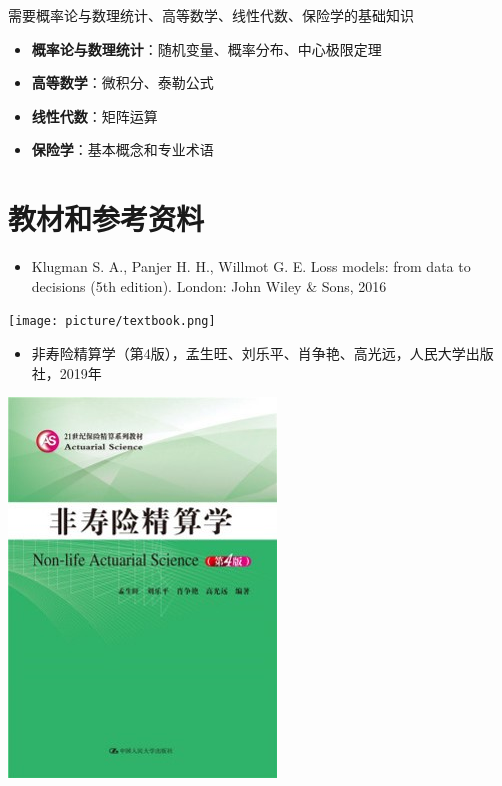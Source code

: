 \documentclass[
]{book}
\providecommand{\tightlist}{%
  \setlength{\itemsep}{0pt}\setlength{\parskip}{0pt}}
\begin{document}
需要概率论与数理统计、高等数学、线性代数、保险学的基础知识

\begin{itemize}
\tightlist
\item
  \textbf{概率论与数理统计}：随机变量、概率分布、中心极限定理
\item
  \textbf{高等数学}：微积分、泰勒公式
\item
  \textbf{线性代数}：矩阵运算
\item
  \textbf{保险学}：基本概念和专业术语
\end{itemize}

\hypertarget{ux6559ux6750ux548cux53c2ux8003ux8d44ux6599}{%
\section{教材和参考资料}\label{ux6559ux6750ux548cux53c2ux8003ux8d44ux6599}}

\begin{itemize}
\tightlist
\item
  Klugman S. A., Panjer H. H., Willmot G. E. Loss models: from data to decisions (5th edition). London: John Wiley \& Sons, 2016
\end{itemize}

\texttt{[image: picture/textbook.png]}

\begin{itemize}
\tightlist
\item
  非寿险精算学（第4版），孟生旺、刘乐平、肖争艳、高光远，人民大学出版社，2019年
\end{itemize}

\includegraphics{picture/lec0-reference1.jpg}
\end{document}

